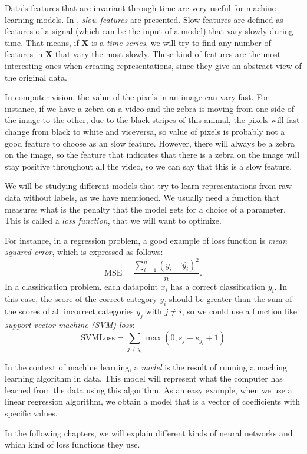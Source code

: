 Data's features that are invariant through time are very useful for machine learning models. In \citep{wiskott_slow_2002}, \emph{slow features} are presented. Slow features are defined as features of a signal 
(which can be the input of a model) that vary slowly during time. That means, if $\bm{X}$ is a \emph{time series}\footnotemark, we will try to find any number of features in $\bm{X}$ that vary the most slowly.
These kind of features are the most interesting ones when creating representations, since they give an abstract view of the original data.\\



\begin{nexample} In computer vision, the value of the pixels in an image can vary fast. For instance, if we have a zebra on a video and the zebra is moving from one side of the image to the other, due 
to the black stripes of this animal, the pixels will fast change from black to white and viceversa, so value of pixels is probably not a good feature to choose as an slow feature. However, there will always
be a zebra on the image, so the feature that indicates that there is a zebra on the image will stay positive throughout all the video, so we can say that this is a slow feature.
\end{nexample}

We will be studying different models that try to learn representations from raw data without labels, as we have mentioned. We usually need a function that measures what is the penalty that the model gets for a choice of a parameter.
This is called a \emph{loss function}, that we will want to optimize.

For instance, in a regression problem, a good example of loss function is \emph{mean squared error}, which is expressed as follows:
\[
\text{MSE} = \frac{\sum_{i =1 }^n \left(y_i - \hat{y_i}\right)^2}{n}.
\]
In a classification problem, each datapoint $x_i$ has a correct classification $y_i$. In this case, the score of the correct category $y_i$ should be greater than the sum of the scores of all incorrect categories $y_j$ with $j \neq i$,
 so we could use a function like \emph{support vector machine (SVM) loss}:
\[
\text{SVMLoss} = \sum_{j \neq y_i} \max(0,s_j - s_{y_i} + 1)
\]


In the context of machine learning, a \emph{model} is the result of running a maching learning algorithm in data. This model will represent what the computer has learned from the data using this algorithm. As an easy example, when we use a
linear regression algorithm, we obtain a model that is a vector of coefficients with specific values.

In the following chapters, we will explain different kinds of neural networks and which kind of loss functions they use. 
